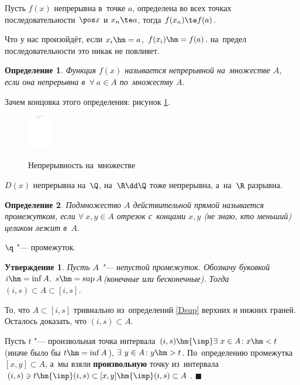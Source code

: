 \documentclass[a4paper,10pt,twoside]{article}
\newtheorem{Def}{Определение}[section]
\newtheorem{Ut}{Утверждение}[section]
\newenvironment{Proof}
       {\par\noindent{\textbf{Доказательство.}}}
       {\hfill$\scriptstyle\blacksquare$}
\begin{document}
Пусть $f(x)$ непрерывна в~точке $a$, определена во всех точках последовательности $\pos x$ и $x_n\te a$, тогда $f(x_n)\te f(a)$.


Что у нас произойдёт, если $x_i\hm=a$, $f(x_i)\hm=f(a)$. на~предел последовательности это никак не повлияет.

\begin{Def}
Функция $f(x)$ называется непрерывной на~множестве $A$, если она непрерывна в~$\forall\  a\in A$ по~множеству $A$.
\end{Def}

Зачем концовка этого определения: рисунок \ref{neopmno}.

\begin{figure}[htbp]\centering
    \includegraphics[height=1.5cm]{img/final/galat/nep.pdf}\\ \caption{Непрерывность на~множестве} \label{neopmno}
\end{figure}
$D(x)$ непрерывна на~$\Q$, на~$\R\dd\Q$ тоже непрерывна, а~на~$\R$ разрывна.

\begin{Def}
Подмножество $A$ действительной прямой называется промежутком, если
$\forall\  x,y\in A$ отрезок с~концами $x,y$ (не знаю, кто меньший) целиком лежит в~$A$.
\end{Def}

$\q$ "--- промежуток.

\begin{Ut}Пусть $A$ "--- непустой промежуток. Обозначу буковкой $i\hm=\inf A,\ s\hm=\sup A$(конечные или бесконечные). 
Тогда $(i,s)\subset A\subset[i,s]$.
\end{Ut}

\begin{Proof}
То, что $A\subset[i,s]$ тривиально из~определений \ref{Dsup} верхних и нижних граней. Осталось доказать, что $(i,s)\subset A$.

Пусть $t$ "--- произвольная точка интервала $(i,s)\hm{\imp} \exists\  x\in A\colon
x\hm<t$ (иначе было бы $t\hm=\inf A$), $\exists\  y\in A\colon y\hm>t$. По~определению промежутка $[x,y]\subset A$, а~мы взяли
\textbf{произвольную} точку из~интервала $(i,s)\ni t\hm{\imp} (i,s)\subset[x,y]\hm{\imp} (i,s)\subset A$.
\end{Proof}
\end{document}
